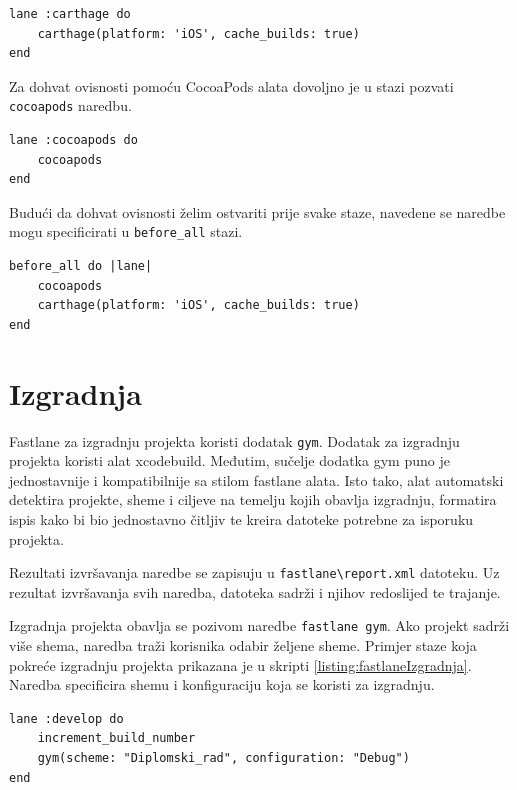 \documentclass[times, utf8, diplomski, numeric]{fer}
\begin{document}
\begin{appendices}
\begin{lstlisting}[caption=Dohvaćanje ovisnosti korištenjem carthage dodatka, label=fig:fastlaneCarthage]
lane :carthage do
    carthage(platform: 'iOS', cache_builds: true)
end
\end{lstlisting}

Za dohvat ovisnosti pomoću CocoaPods alata dovoljno je u stazi pozvati \verb|cocoapods| naredbu.

\begin{lstlisting}[caption=Dohvaćanje ovisnosti korištenjem cocoapods dodatka, label=fig:fastlaneCocoaPods]
lane :cocoapods do
    cocoapods
end
\end{lstlisting}

Budući da dohvat ovisnosti želim ostvariti prije svake staze, navedene se naredbe mogu specificirati u \verb|before_all| stazi.

\begin{lstlisting}[caption=Dohvat ovisnosti prije obavljanja svake staze]
before_all do |lane|
    cocoapods
    carthage(platform: 'iOS', cache_builds: true)
end
\end{lstlisting}

\section{Izgradnja}

Fastlane za izgradnju projekta koristi dodatak \verb|gym|\citep{fastlane:gym}. Dodatak za izgradnju projekta koristi alat xcodebuild. Međutim, sučelje dodatka gym puno je jednostavnije i kompatibilnije sa stilom fastlane alata. Isto tako, alat automatski detektira projekte, sheme i ciljeve na temelju kojih obavlja izgradnju, formatira ispis kako bi bio jednostavno čitljiv te kreira datoteke potrebne za isporuku projekta.

Rezultati izvršavanja naredbe se zapisuju u \verb|fastlane\report.xml| datoteku. Uz rezultat izvršavanja svih naredba, datoteka sadrži i njihov redoslijed te trajanje.

Izgradnja projekta obavlja se pozivom naredbe \verb|fastlane gym|. Ako projekt sadrži više shema, naredba traži korisnika odabir željene sheme. Primjer staze koja pokreće izgradnju projekta prikazana je u skripti \ref{listing:fastlaneIzgradnja}. Naredba specificira shemu i konfiguraciju koja se koristi za izgradnju.

\begin{lstlisting}[caption=Izgradnja projekta korištenjem gym dodatka, label=listing:fastlaneIzgradnja]
lane :develop do
    increment_build_number
    gym(scheme: "Diplomski_rad", configuration: "Debug")
end
\end{lstlisting}


\end{appendices}
\end{document}
